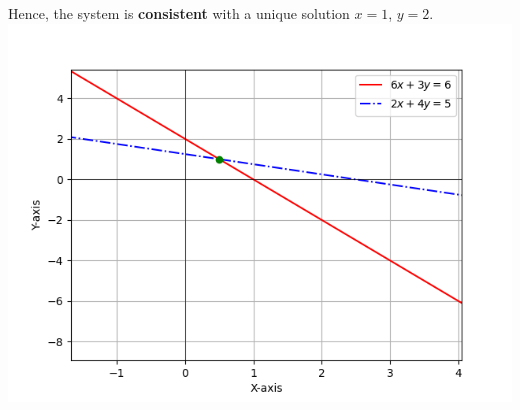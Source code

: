 \documentclass[journal]{IEEEtran}
\begin{document}
Hence, the system is \textbf{consistent} with a unique solution $x=1$, $y=2$. 
\includegraphics[width=\textwidth]{Figs/Figure_1.png}
\end{document}
